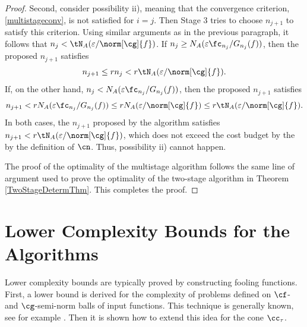 \documentclass[]{elsarticle}
\theoremstyle{definition}
\theoremstyle{remark}
\begin{document}
\begin{proof}
Second, consider possibility ii), meaning that the convergence criterion, \eqref{multistageconv}, is not satisfied for $i=j$.  Then Stage 3 tries to choose $n_{j+1}$ to satisfy this criterion.  Using similar arguments as in the previous paragraph, it follows that $n_j < \tN_A(\varepsilon/\norm[\cg]{f})$. 
If $n_j \ge N_{A}(\varepsilon \fc_{n_j}/G_{n_j}(f))$, then the proposed $n_{j+1}$ satisfies
\begin{equation*}
n_{j+1} \le r  n_j < r \tN_{A}(\varepsilon/\norm[\cg]{f}).
\end{equation*}
If, on the other hand, $n_j < N_{A}(\varepsilon \fc_{n_j}/G_{n_j}(f))$, then the proposed $n_{j+1}$ satisfies
\begin{equation*}
n_{j+1} < r  N_{A}(\varepsilon \fc_{n_j}/G_{n_j}(f)) \le r  N_{A}(\varepsilon/\norm[\cg]{f}) \le r \tN_{A}(\varepsilon/\norm[\cg]{f}).
\end{equation*}
In both cases, the $n_{j+1}$ proposed by the algorithm satisfies $n_{j+1} < r \tN_{A}(\varepsilon/\norm[\cg]{f})$, which does not exceed the cost budget by the  by the definition of $\cn$.  Thus, possibility ii) cannot happen.

The proof of the optimality of the multistage algorithm follows the same line of argument used to prove the optimality of the two-stage algorithm in Theorem \ref{TwoStageDetermThm}.  This completes the proof.
\end{proof}

\section{Lower Complexity Bounds for the Algorithms} \label{LowBoundSec}
Lower complexity bounds are typically proved by constructing fooling functions.  First, a lower bound is derived for the complexity of problems defined on $\cf$- and $\cg$-semi-norm balls of input functions.  This technique is generally known, see for example \cite[p.\ 11--12]{TraWer98}.  Then it is shown how to extend this idea for the cone $\cc_{\tau}$.  
\end{document}
